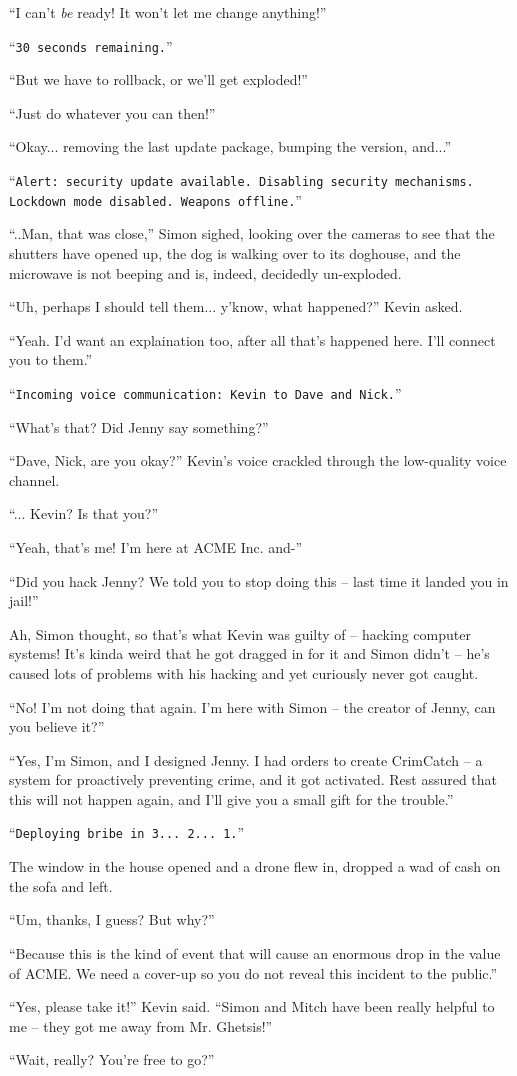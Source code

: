 \documentclass[10pt,a4paper]{article}
\newcommand{\lang}[2]{ #2 \par}
\newcommand{\ai}[2]{
	\lang{
		-- \texttt{#1}
	}{
		``\texttt{#2}''
	}
}
\newcommand{\ainame}{Jenny}
\newcommand{\mainname}{Simon}
\newcommand{\auxname}{Mitch}
\newcommand{\corpname}{ACME Inc.}
\newcommand{\corpnameshort}{ACME}
\newcommand{\policename}{Mr. Ghetsis}
\newcommand{\featurename}{CrimCatch}
\newcommand{\criminalname}{Kevin}
\newcommand{\friendAname}{Dave}
\newcommand{\friendBname}{Nick}
\begin{document}
\lang{...}{``I can't \emph{be} ready! It won't let me change anything!''}
\ai{...}{30 seconds remaining.}
\lang{...}{``But we have to rollback, or we'll get exploded!''}
\lang{...}{``Just do whatever you can then!''}
\lang{...}{``Okay... removing the last update package, bumping the version, and...''}
\ai{...}{Alert: security update available. Disabling security mechanisms. Lockdown mode disabled. Weapons offline.}
\lang{...}{``..Man, that was close,'' \mainname{} sighed, looking over the cameras to see that the shutters have opened up, the dog is walking over to its doghouse, and the microwave is not beeping and is, indeed, decidedly un-exploded.}
\lang{...}{``Uh, perhaps I should tell them... y'know, what happened?'' \criminalname{} asked.}
\lang{...}{``Yeah. I'd want an explaination too, after all that's happened here. I'll connect you to them.''}
\ai{...}{Incoming voice communication: \criminalname{} to \friendAname{} and \friendBname{}.}
\lang{...}{``What's that? Did \ainame{} say something?''}
\lang{...}{``\friendAname{}, \friendBname{}, are you okay?'' \criminalname{}'s voice crackled through the low-quality voice channel.}
\lang{...}{``... \criminalname{}? Is that you?''}
\lang{...}{``Yeah, that's me! I'm here at \corpname{} and-''}
\lang{...}{``Did you hack \ainame{}? We told you to stop doing this -- last time it landed you in jail!''}
\lang{...}{Ah, \mainname{} thought, so that's what \criminalname{} was guilty of -- hacking computer systems! It's kinda weird that he got dragged in for it and \mainname{} didn't -- he's caused lots of problems with his hacking and yet curiously never got caught.}
\lang{...}{``No! I'm not doing that again. I'm here with \mainname{} -- the creator of \ainame{}, can you believe it?''}
\lang{...}{``Yes, I'm \mainname{}, and I designed \ainame{}. I had orders to create \featurename{} -- a system for proactively preventing crime, and it got activated. Rest assured that this will not happen again, and I'll give you a small gift for the trouble.''}
\ai{...}{Deploying bribe in 3... 2... 1.}
\lang{...}{The window in the house opened and a drone flew in, dropped a wad of cash on the sofa and left.}
\lang{...}{``Um, thanks, I guess? But why?''}
\lang{...}{``Because this is the kind of event that will cause an enormous drop in the value of \corpnameshort{}. We need a cover-up so you do not reveal this incident to the public.''}
\lang{...}{``Yes, please take it!'' \criminalname{} said. ``\mainname{} and \auxname{} have been really helpful to me -- they got me away from \policename{}!''}
\lang{...}{``Wait, really? You're free to go?''}
\end{document}
